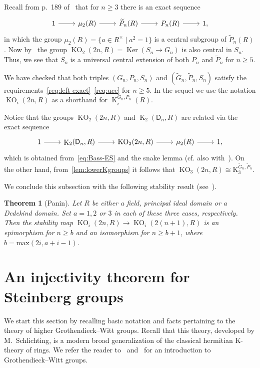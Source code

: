 \documentclass[oneside, 8pt]{amsart}
\newtheorem{externaltheorem}[lemma]{Theorem}
\theoremstyle{remark}
\theoremstyle{definition}
\numberwithin{lemma}{section}
\numberwithin{prop}{section}
\numberwithin{corollary}{section}
\numberwithin{externaltheorem}{section}
\DeclareMathOperator{\Ker}{Ker}
\DeclareMathOperator{\K}{K}
\DeclareMathOperator{\KO}{KO}
\newcommand{\rD}{\mathsf{D}}
\numberwithin{equation}{section}
\begin{document}
Recall from p.~189 of~\cite{Ba74} that for $n\geq 3$ there is an exact sequence
\begin{equation}\label{eq:Bass-ES} \begin{tikzcd} 1 \arrow{r} & \mu_2(R) \arrow{r} & \widetilde{P}_n(R) \arrow{r} & P_n(R) \arrow{r} & 1, \end{tikzcd} \end{equation}
in which the group $\mu_2(R) = \{ a \in R^\times \mid a^2 = 1 \}$ is a central subgroup of $\widetilde{P}_n(R)$.
Now by~\cite[\S~7(v)]{St67} the group $\KO_2(2n, R) = \Ker(S_n \to G_n)$ is also central in $S_n$.
Thus, we see that $S_n$ is a universal central extension of both $P_n$ and $\widetilde{P}_n$ for $n\geq 5$.

We have checked that both triples $(G_n, P_n, S_n)$ and $(\widetilde{G}_n, \widetilde{P}_n, S_n)$ satisfy the requirements~\ref{req:left-exact}--\ref{req:uce} for $n \geq 5$. In the sequel we use the notation $\KO_i(2n, R)$ as a shorthand for $\K_i^{G_n, P_n}(R)$. 

Notice that the groups $\KO_2(2n, R)$ and $\K_2(\rD_n, R)$ are related via the exact sequence
\[ \begin{tikzcd} 1 \arrow{r} & \K_2(\rD_n, R) \arrow{r} & \KO_2(2n, R) \arrow{r} & \mu_2(R) \arrow{r} & 1, \end{tikzcd} \]
which is obtained from~\eqref{eq:Bass-ES} and the snake lemma (cf. also with~\cite[Corollary~4.3.5]{Ba74}).
On the other hand, from~\cref{lem:lowerKgroups} it follows that $\KO_3(2n, R) \cong \mathrm{K}_3^{\widetilde{G}_n, \widetilde{P}_n}$.

We conclude this subsection with the following stability result (see~\cite[Theorem~9.4]{Pa89}).
\begin{externaltheorem}[Panin] \label{Panin-stability}
 Let $R$ be either a field, principal ideal domain or a Dedekind domain. Set $a = 1,2$ or $3$ in each of these three cases, respectively.
 Then the stability map $\KO_i(2n, R) \to \KO_i(2(n+1), R)$ is an epimorphism for $n \geq b$ 
 and an isomorphism for $n \geq b + 1$, where $b = \mathrm{max}(2i, a+i-1)$. \end{externaltheorem}

\section{An injectivity theorem for Steinberg groups} \label{firstPart}
We start this section by recalling basic notation and facts pertaining to the theory of higher Grothendieck--Witt groups. Recall that this theory, developed by M.~Schlichting, is a modern broad generalization of the classical hermitian K-theory of rings. We refer the reader to~\cite[\S~2]{FRS12} and~\cite[\S~2]{AF17} for an introduction to Grothendieck--Witt groups.
\end{document}
